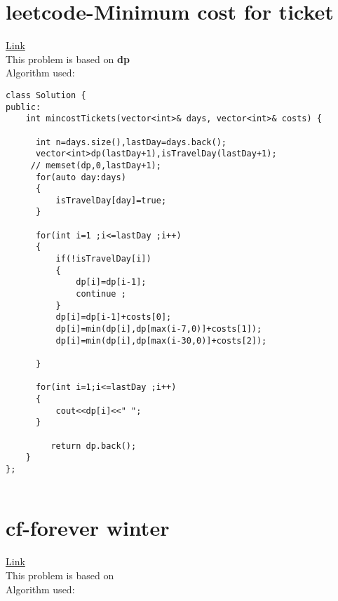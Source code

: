 \documentclass{article}
\begin{document}
\section{leetcode-Minimum cost for ticket} \href{https://leetcode.com/problems/minimum-cost-for-tickets/description/}{Link} \\

This problem is based on  \textbf{  dp }\\
Algorithm used: \textbf{}\\

\begin{lstlisting}[style=cppStyle]
class Solution {
public:
    int mincostTickets(vector<int>& days, vector<int>& costs) {

      int n=days.size(),lastDay=days.back();
      vector<int>dp(lastDay+1),isTravelDay(lastDay+1);
     // memset(dp,0,lastDay+1);
      for(auto day:days)
      {
          isTravelDay[day]=true;
      }

      for(int i=1 ;i<=lastDay ;i++)
      {
          if(!isTravelDay[i])
          {
              dp[i]=dp[i-1];
              continue ;
          }
          dp[i]=dp[i-1]+costs[0];
          dp[i]=min(dp[i],dp[max(i-7,0)]+costs[1]);
          dp[i]=min(dp[i],dp[max(i-30,0)]+costs[2]);

      }
     
      for(int i=1;i<=lastDay ;i++)
      {
          cout<<dp[i]<<" ";
      }
        
         return dp.back();
    }
};


\end{lstlisting}




\section{cf-forever winter} \href{https://codeforces.com/contest/1829/problem/F}{Link} \\

This problem is based on  \textbf{   }\\
Algorithm used: \textbf{}\\
\end{document}
